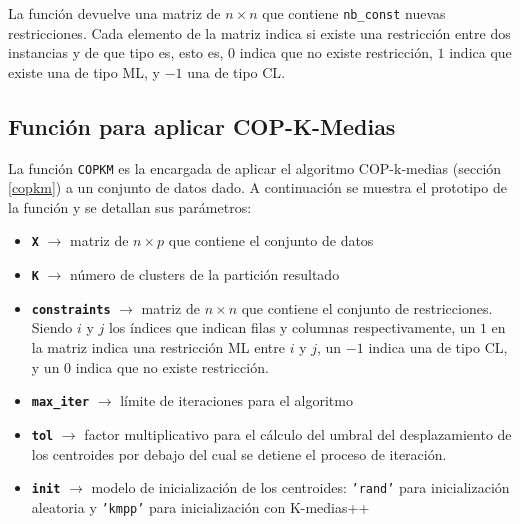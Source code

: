 La función devuelve una matriz de $n \times n$ que contiene \texttt{nb\_const} nuevas restricciones. Cada elemento de la matriz indica si existe una restricción entre dos instancias y de que tipo es, esto es, $0$ indica que no existe restricción, $1$ indica que existe una de tipo \acs{ML}, y $-1$ una de tipo \acs{CL}.

\subsection{Función para aplicar COP-K-Medias}

La función \texttt{COPKM} es la encargada de aplicar el algoritmo COP-k-medias (sección \ref{copkm}) a un conjunto de datos dado. A continuación se muestra el prototipo de la función y se detallan sus parámetros:


\begin{itemize}
	
	\item \textbf{\texttt{X}} {$\longrightarrow$ matriz de $n \times p$ que contiene el conjunto de datos}
	
	\item \textbf{\texttt{K}} {$\longrightarrow$ número de clusters de la partición resultado}
	
	\item \textbf{\texttt{constraints}} {$\longrightarrow$ matriz de $n \times n$ que contiene el conjunto de restricciones. Siendo $i$ y $j$ los índices que indican filas y columnas respectivamente, un $1$ en la matriz indica una restricción \acs{ML} entre $i$ y $j$, un $-1$ indica una de tipo \acs{CL}, y un $0$ indica que no existe restricción.}
	
	\item \textbf{\texttt{max\_iter}} {$\longrightarrow$ límite de iteraciones para el algoritmo}
	
	\item \textbf{\texttt{tol}} {$\longrightarrow$ factor multiplicativo para el cálculo del umbral del desplazamiento de los centroides por debajo del cual se detiene el proceso de iteración.}
	
	\item \textbf{\texttt{init}} {$\longrightarrow$ modelo de inicialización de los centroides: \texttt{'rand'} para inicialización aleatoria y \texttt{'kmpp'} para inicialización con K-medias++}
	
\end{itemize}

